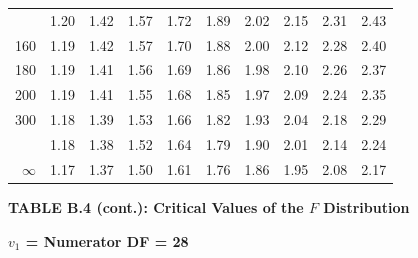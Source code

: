 \documentclass[10pt]{article}
\begin{document}
\begin{longtable}{@{}r!{\vrule width 0.8pt\hspace{0.55em}}rrrrrrrrr@{}}
 & 1.20 & 1.42 & 1.57 & 1.72 & 1.89 & 2.02 & 2.15 & 2.31 & 2.43 \\
160 & 1.19 & 1.42 & 1.57 & 1.70 & 1.88 & 2.00 & 2.12 & 2.28 & 2.40 \\
180 & 1.19 & 1.41 & 1.56 & 1.69 & 1.86 & 1.98 & 2.10 & 2.26 & 2.37 \\
200 & 1.19 & 1.41 & 1.55 & 1.68 & 1.85 & 1.97 & 2.09 & 2.24 & 2.35 \\
300 & 1.18 & 1.39 & 1.53 & 1.66 & 1.82 & 1.93 & 2.04 & 2.18 & 2.29 \\
 & 1.18 & 1.38 & 1.52 & 1.64 & 1.79 & 1.90 & 2.01 & 2.14 & 2.24 \\
$\infty$ & 1.17 & 1.37 & 1.50 & 1.61 & 1.76 & 1.86 & 1.95 & 2.08 & 2.17 \\
\end{longtable}
\newpage
\thispagestyle{empty}
\begin{center}
{\large\bfseries TABLE B.4 (cont.): Critical Values of the $F$ Distribution\par}
\end{center}
{\large\bfseries $v_1$ = Numerator DF = 28\par}
\vspace{0.5em}
\small
\end{document}
